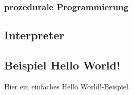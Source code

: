 \subsubsection{prozedurale Programmierung}
\subsection{Interpreter}


\subsection{Beispiel \glqq Hello World!\grqq}
Hier ein einfaches \glqq Hello World!\grqq -Beispiel.


